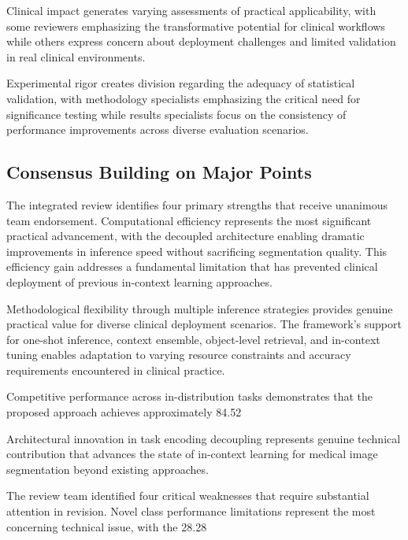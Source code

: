 Clinical impact generates varying assessments of practical applicability, with some reviewers emphasizing the transformative potential for clinical workflows while others express concern about deployment challenges and limited validation in real clinical environments.

Experimental rigor creates division regarding the adequacy of statistical validation, with methodology specialists emphasizing the critical need for significance testing while results specialists focus on the consistency of performance improvements across diverse evaluation scenarios.

\subsection{Consensus Building on Major Points}
The integrated review identifies four primary strengths that receive unanimous team endorsement. Computational efficiency represents the most significant practical advancement, with the decoupled architecture enabling dramatic improvements in inference speed without sacrificing segmentation quality. This efficiency gain addresses a fundamental limitation that has prevented clinical deployment of previous in-context learning approaches.

Methodological flexibility through multiple inference strategies provides genuine practical value for diverse clinical deployment scenarios. The framework's support for one-shot inference, context ensemble, object-level retrieval, and in-context tuning enables adaptation to varying resource constraints and accuracy requirements encountered in clinical practice.

Competitive performance across in-distribution tasks demonstrates that the proposed approach achieves approximately 84.52%

Architectural innovation in task encoding decoupling represents genuine technical contribution that advances the state of in-context learning for medical image segmentation beyond existing approaches.

The review team identified four critical weaknesses that require substantial attention in revision. Novel class performance limitations represent the most concerning technical issue, with the 28.28%

